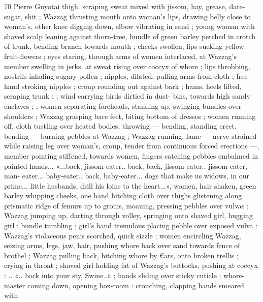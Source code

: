 70 Pierre Guyotai
thigh. scraping sweat mixed with jissom, hay, grease, date-sugar, shit
; Wazzag thrusting mouth onto woman's lips, drawing belly close to
woman's, other knee digging down, elbow vibrating in sand ; young
woman with shaved scalp leaning against thorn-tree, bundle of green
barley perched in crotch of trunk, bending branch towards mouth ;
cheeks swollen, lips sucking yellow fruit-flowers ; eyes staring,
through arms of women interlaced, at Wazzag’s member swelling in
jerks. at sweat rising over coccyx of whore ; lips throbbing, nostrils
inhaling sugary pollen ; nipples, dilated, pulling arms from cloth ;
free hand stroking nipples ; croup rounding out against bark ; hams,
heels lifted, scraping trunk ; ; wind carrying birds dirtied in dust-
bins, towards high sandy enclaves ; ; women separating foreheads,
standing up, swinging bundles over shoulders ; Wazzag grasping
bare feet, biting bottom of dresses ; women running off, cloth
tustling over heated bodies, throwing — bending, standing erect.
bending — burning pebbles at Wazzag ; Wazzag running, lame —
nerve strained while raising leg over woman's, croup, tender from
continuous forced erections —, member pointing stiffened, towards
women, fingers catching pebbles embalmed in painted hands...
«...back, jissom-eater.. back, back, jissom-eater.. jissom-eater, man-
eater... baby-eater.. back, baby-eater... dogs that make us widows, in
our prime... little husbands, drill his loins to the heart...», women,
hair shaken, green barley whipping cheeks, one hand hitching cloth
over thighs glistening along prismatic ridge of femurs up to groins,
moaning, pressing pebbles over vulvas ; Wazzag jumping up, darting
through volley, springing onto shaved girl, hugging girl : bundle
tumbling ; girl's hand tremulous placing pebble over exposed vulva :
Wazzag's violaceous penis scorched, quick sizzle ; women encircling
Wazzag, seizing arms, legs, jaw, hair, pushing whore back over sand
towards fence of brothel ; Wazzag pulling back, hitching whore by
€ars, onto broken trellis ; crying in throat ; shaved girl holding fat of
Wazzag's buttocks, pushing at coccyx : .. «.. back into your sty,
Swine..» ; hands sliding over sticky cuticle ; whore-master coming
down, opening box-room : crouching, clapping hands smeared with

